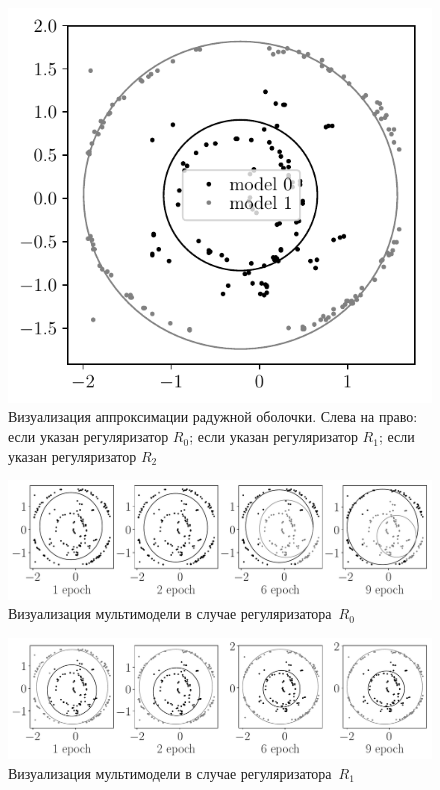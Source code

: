 \documentclass[12pt]{a&t}
\begin{document}
\begin{figure}[h!]
\begin{center}
	\includegraphics[height = 0.17\textheight]{prior_regular_real_example}
\end{center}
\caption{Визуализация аппроксимации радужной оболочки. Слева на право: если указан регуляризатор $R_0$; если указан регуляризатор $R_1$; если указан регуляризатор $R_2$}
\label{ce:fig6-1}
\end{figure}

\begin{figure}[h!]
\begin{center}
     \includegraphics[width=\textwidth]{experiment_real_not_prior}
\end{center}
     \caption{Визуализация мультимодели в случае регуляризатора~$R_0$}
    \label{ce:fig7}
\end{figure}

\begin{figure}[h!]
\begin{center}
     \includegraphics[width=\textwidth]{experiment_real_prior}
\end{center}
     \caption{Визуализация мультимодели в случае регуляризатора~$R_1$}
    \label{ce:fig8}
\end{figure}
\end{document}
